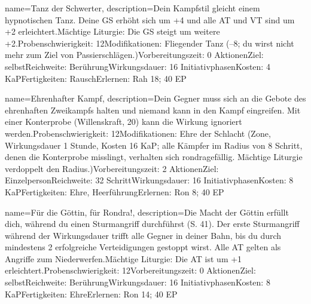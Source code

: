 {
    name={Tanz der Schwerter},
    description={Dein Kampfstil gleicht einem hypnotischen Tanz. Deine GS erhöht sich um +4 und alle AT und VT sind um +2 erleichtert.\newline Mächtige Liturgie: Die GS steigt um weitere +2.\newline Probenschwierigkeit: 12\newline Modifikationen: Fliegender Tanz (–8; du wirst nicht mehr zum Ziel von Passierschlägen.)\newline Vorbereitungszeit: 0 Aktionen\newline Ziel: selbst\newline Reichweite: Berührung\newline Wirkungsdauer: 16 Initiativphasen\newline Kosten: 4 KaP\newline Fertigkeiten: Rausch\newline Erlernen: Rah 18; 40 EP}
}


{
    name={Ehrenhafter Kampf},
    description={Dein Gegner muss sich an die Gebote des ehrenhaften Zweikampfs halten und niemand kann in den Kampf eingreifen. Mit einer Konterprobe (Willenskraft, 20) kann die Wirkung ignoriert werden.\newline Probenschwierigkeit: 12\newline Modifikationen: Ehre der Schlacht (Zone, Wirkungsdauer 1 Stunde, Kosten 16 KaP; alle Kämpfer im Radius von 8 Schritt, denen die Konterprobe misslingt, verhalten sich rondragefällig. Mächtige Liturgie verdoppelt den Radius.)\newline Vorbereitungszeit: 2 Aktionen\newline Ziel: Einzelperson\newline Reichweite: 32 Schritt\newline Wirkungsdauer: 16 Initiativphasen\newline Kosten: 8 KaP\newline Fertigkeiten: Ehre, Heerführung\newline Erlernen: Ron 8; 40 EP}
}


{
    name={Für die Göttin, für Rondra!},
    description={Die Macht der Göttin erfüllt dich, während du einen Sturmangriff durchführst (S. 41). Der erste Sturmangriff während der Wirkungsdauer trifft alle Gegner in deiner Bahn, bis du durch mindestens 2 erfolgreiche Verteidigungen gestoppt wirst. Alle AT gelten als Angriffe zum Niederwerfen.\newline Mächtige Liturgie: Die AT ist um +1 erleichtert.\newline Probenschwierigkeit: 12\newline Vorbereitungszeit: 0 Aktionen\newline Ziel: selbst\newline Reichweite: Berührung\newline Wirkungsdauer: 16 Initiativphasen\newline Kosten: 8 KaP\newline Fertigkeiten: Ehre\newline Erlernen: Ron 14; 40 EP}
}


